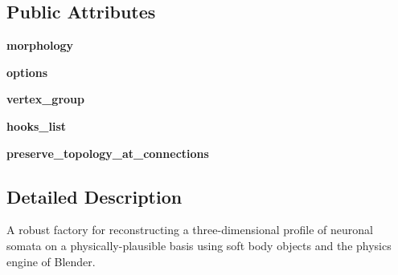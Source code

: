 \subsection*{Public Attributes}
\begin{DoxyCompactItemize}
\item 
{\bfseries morphology}\hypertarget{classmeshy_1_1neuromorphovis_1_1builders_1_1soma_1_1soma__builder_1_1SomaBuilder_a5c4993ac4c10d9bc2a738b11e6c1aba6}{}\label{classmeshy_1_1neuromorphovis_1_1builders_1_1soma_1_1soma__builder_1_1SomaBuilder_a5c4993ac4c10d9bc2a738b11e6c1aba6}

\item 
{\bfseries options}\hypertarget{classmeshy_1_1neuromorphovis_1_1builders_1_1soma_1_1soma__builder_1_1SomaBuilder_a4a815400e1d1008521624b435bca3bcb}{}\label{classmeshy_1_1neuromorphovis_1_1builders_1_1soma_1_1soma__builder_1_1SomaBuilder_a4a815400e1d1008521624b435bca3bcb}

\item 
{\bfseries vertex\+\_\+group}\hypertarget{classmeshy_1_1neuromorphovis_1_1builders_1_1soma_1_1soma__builder_1_1SomaBuilder_a9a7d5be2245e12ef798969e7165d8a90}{}\label{classmeshy_1_1neuromorphovis_1_1builders_1_1soma_1_1soma__builder_1_1SomaBuilder_a9a7d5be2245e12ef798969e7165d8a90}

\item 
{\bfseries hooks\+\_\+list}\hypertarget{classmeshy_1_1neuromorphovis_1_1builders_1_1soma_1_1soma__builder_1_1SomaBuilder_ad72261f6a80fb0affe923c8dd0e8f012}{}\label{classmeshy_1_1neuromorphovis_1_1builders_1_1soma_1_1soma__builder_1_1SomaBuilder_ad72261f6a80fb0affe923c8dd0e8f012}

\item 
{\bfseries preserve\+\_\+topology\+\_\+at\+\_\+connections}\hypertarget{classmeshy_1_1neuromorphovis_1_1builders_1_1soma_1_1soma__builder_1_1SomaBuilder_a57f166ee229e22205d38e05177fc23bd}{}\label{classmeshy_1_1neuromorphovis_1_1builders_1_1soma_1_1soma__builder_1_1SomaBuilder_a57f166ee229e22205d38e05177fc23bd}

\end{DoxyCompactItemize}


\subsection{Detailed Description}


\begin{DoxyVerb}A robust factory for reconstructing a three-dimensional profile of neuronal somata on a
physically-plausible basis using soft body objects and the physics engine of Blender.
\end{DoxyVerb}
 

